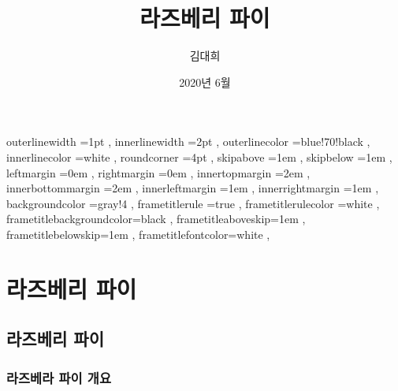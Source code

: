 \documentclass[12pt, a4paper, oneside]{book}
\let\stdsection\section
\renewcommand\section{\newpage\stdsection}
\begin{document}
	
			\dominitoc
			\doparttoc			




			\title{라즈베리 파이}
			\author{김대희}
			\date{2020년 6월}
			\maketitle


			\tableofcontents 		%
			\cleardoublepage
			\listoftables 			%





		 {
						outerlinewidth		=1pt			,%
						innerlinewidth		=2pt			,%
						outerlinecolor		=blue!70!black	,%
						innerlinecolor		=white 			,%
						roundcorner			=4pt			,%
						skipabove			=1em 			,%
						skipbelow			=1em 			,%
						leftmargin			=0em			,%
						rightmargin			=0em			,%
						innertopmargin		=2em 			,%
						innerbottommargin 	=2em 			,%
						innerleftmargin		=1em 			,%
						innerrightmargin		=1em 			,%
						backgroundcolor		=gray!4			,%
						frametitlerule		=true 			,%
						frametitlerulecolor	=white			,%
						frametitlebackgroundcolor=black		,%
						frametitleaboveskip=1em 			,%
						frametitlebelowskip=1em 			,%
						frametitlefontcolor=white 			,%
						}



	\part{라즈베리 파이}
	\noptcrule
	\parttoc				



	\chapter{라즈베리 파이}
	\noptcrule

	\newpage	
	\minitoc





%
	\section{라즈베라 파이 개요}
\end{document}
